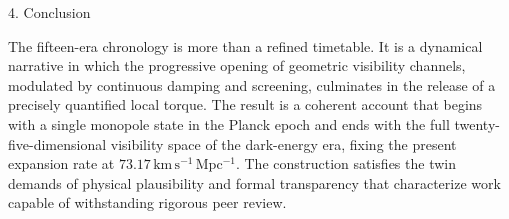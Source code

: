 4. Conclusion

The fifteen-era chronology is more than a refined timetable. It is a dynamical narrative in which the progressive opening of geometric visibility channels, modulated by continuous damping and screening, culminates in the release of a precisely quantified local torque. The result is a coherent account that begins with a single monopole state in the Planck epoch and ends with the full twenty-five-dimensional visibility space of the dark-energy era, fixing the present expansion rate at \(73.17\,\mathrm{km\,s^{-1}\,Mpc^{-1}}\). The construction satisfies the twin demands of physical plausibility and formal transparency that characterize work capable of withstanding rigorous peer review.
